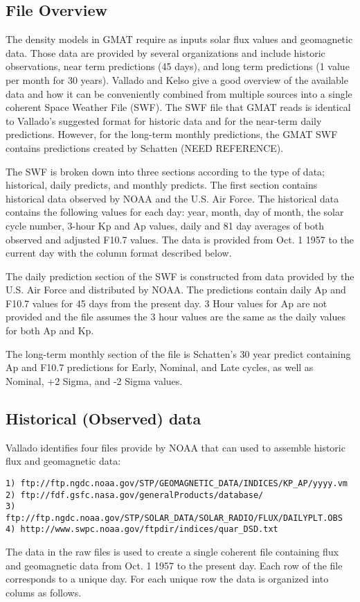 \subsection{File Overview}


The density models in GMAT require as inputs solar flux values and geomagnetic data.  Those data are provided by several organizations and include historic observations, near term predictions (45 days), and long term predictions (1 value per month for 30 years).   Vallado and Kelso\cite{Vallado:Kelso:05} give a good overview of the available data and how it can be conveniently combined from multiple sources into a single coherent Space Weather File (SWF).  The SWF file that GMAT reads is identical to Vallado's suggested format for historic data and for the near-term daily predictions.  However, for the long-term monthly predictions, the GMAT SWF contains predictions created by Schatten (NEED REFERENCE).

The SWF is broken down into three sections according to the type of data; historical, daily predicts, and monthly predicts.   The first section contains historical data observed by NOAA and the U.S. Air Force.  The historical data contains the following values for each day:  year, month, day of month, the solar cycle number, 3-hour Kp and Ap values, daily and 81 day averages of both observed and adjusted F10.7 values.  The data is provided from Oct. 1 1957 to the current day with the column format described below.

The daily prediction section of the SWF is constructed from data provided by the U.S. Air Force and distributed by NOAA.  The predictions contain daily Ap and F10.7 values for 45 days from the present day.  3 Hour values for Ap are not provided and the file assumes the 3 hour values are the same as the daily values for both Ap and Kp.

The long-term monthly section of the file is Schatten's 30 year predict containing Ap and F10.7 predictions for Early, Nominal, and Late cycles, as well as Nominal, +2 Sigma, and -2 Sigma values.
\subsection{Historical (Observed) data}
Vallado\cite{Vallado:Kelso:05} identifies four files provide by NOAA that can used to assemble historic flux and geomagnetic data:
\begin{small}
\begin{verbatim}
1) ftp://ftp.ngdc.noaa.gov/STP/GEOMAGNETIC_DATA/INDICES/KP_AP/yyyy.vm
2) ftp://fdf.gsfc.nasa.gov/generalProducts/database/
3) ftp://ftp.ngdc.noaa.gov/STP/SOLAR_DATA/SOLAR_RADIO/FLUX/DAILYPLT.OBS
4) http://www.swpc.noaa.gov/ftpdir/indices/quar_DSD.txt
\end{verbatim}
\end{small}
%
The data in the raw files is used to create a single coherent file containing flux and geomagnetic data from Oct. 1 1957 to the present day.  Each row of the file corresponds to a unique day. For each unique row the data is organized into colums as follows.


